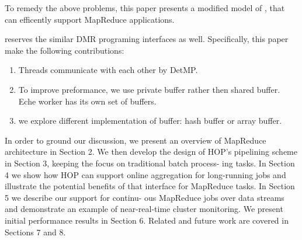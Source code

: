 To remedy the above problems, this paper presents a modified model of \myds, 
that can efficently support MapReduce applications.



\myds reserves the similar DMR programing interfaces as well.
Specifically, this paper make the following contributions:
\begin{enumerate}
\item Threads communicate with each other by DetMP.
\item To improve preformance, we use private buffer rather then shared buffer. Eche worker has its own set of buffers. 
\item we explore different implementation of buffer: hash buffer or array buffer.
\end{enumerate}

In order to ground our discussion, we present an overview
of MapReduce architecture in Section 2. We
then develop the design of HOP’s pipelining scheme in
Section 3, keeping the focus on traditional batch process-
ing tasks. In Section 4 we show how HOP can support
online aggregation for long-running jobs and illustrate
the potential benefits of that interface for MapReduce
tasks. In Section 5 we describe our support for continu-
ous MapReduce jobs over data streams and demonstrate
an example of near-real-time cluster monitoring. We
present initial performance results in Section 6. Related
and future work are covered in Sections 7 and 8.


